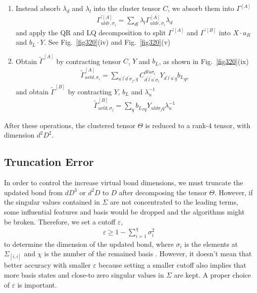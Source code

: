\begin{enumerate}
	\item Instead absorb $\lambda_d$ and $\lambda_l$ into the cluster tensor $C$, we absorb them into $\Gamma^{[A]}$
		\begin{align}
			\Gamma^{\prime [A]}_{uldr,\sigma_i} = \sum_{dl}{\lambda_l \Gamma^{[A]}_{uldr,\sigma_i} \lambda_d}
		\end{align}
		and apply the QR and LQ decomposition to split $\Gamma^{\prime [A]}$ and $\Gamma^{\prime [B]}$ into $X\cdot a_R$ and $b_L \cdot Y$. See Fig.~\ref{fig320}(iv) and Fig.~\ref{fig320}(v) 
	\item Obtain $\widetilde{\Gamma}^{[A]}$ by contracting tensor $C$, $Y$ and $b_L$, as shown in Fig.~\ref{fig320}(ix)
		\begin{align}
			\widetilde{\Gamma}^{[A]}_{urld, \sigma_i} = \sum_{u^{\prime}l^{\prime}d^{\prime}\sigma_j,q}{C^{dlu\sigma_i}_{d^{\prime}l^{\prime}u^{\prime}\sigma_i}Y_{d^{\prime}l^{\prime}u^{\prime}q}{b_L}_{qr}}
		\end{align}
		and obtain $\widetilde{\Gamma}^{[B]}$ by contracting $Y$, $b_L$ and $\lambda_u^{-1}$
		\begin{align}
			\widetilde{\Gamma}^{[B]}_{urld,\sigma_j} = \sum_{q}{{b_L}_{rq}Y_{uld\sigma_j q}\lambda_u^{-1}}
		\end{align}
\end{enumerate}

After these operations, the clustered tensor $\Theta$ is reduced to a rank-4 tensor, with dimension $d^2D^2$.

\subsection{Truncation Error}
\label{truncaterr}
In order to control the increase virtual bond dimensions, we must truncate the updated bond from $dD^3$ or $d^2D$ to $D$ after decomposing the tensor $\Theta$. However, if the singular values contained in $\Sigma$ are not concentrated to the leading terms, some influential features and basis would be dropped and the algorithms might be broken. Therefore, we set a cutoff $\varepsilon$, 
\begin{align}
	\varepsilon \geq 1 - \sum_{i=1}^{\chi}{\sigma_i^2}
\end{align}
to determine the dimension of the updated bond, where $\sigma_i$ is the elements at $\Sigma_{[i,i]}$ and $\chi$ is the number of the remained basis . However, it doesn't mean that better accuracy with smaller $\varepsilon$ because setting a smaller cutoff also implies that more basis states and close-to zero singular values in $\Sigma$ are kept. A proper choice of $\varepsilon$ is important.

